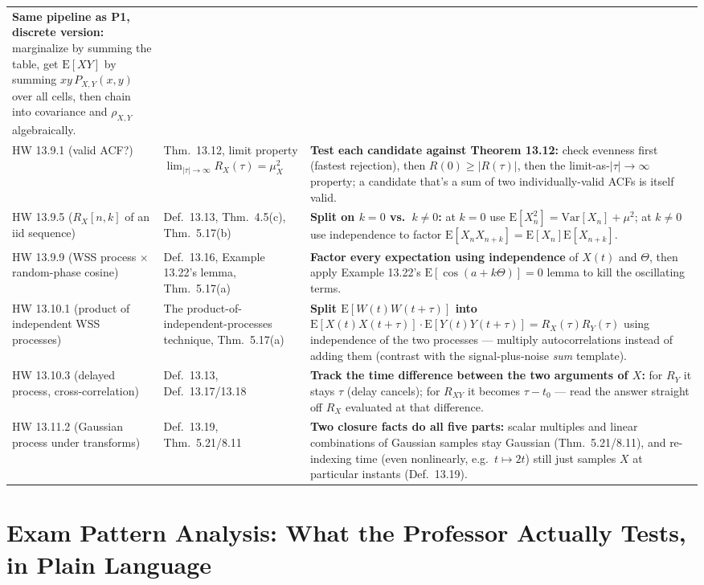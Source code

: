 \documentclass[10pt]{article}
\newcommand{\E}[1]{\mathrm{E}\left[#1\right]}
\newcommand{\Var}[1]{\mathrm{Var}\left[#1\right]}
\begin{document}
{\begin{longtable}{@{}p{2.5cm}p{4.7cm}p{6.4cm}@{}}
\textbf{Same pipeline as P1, discrete version:} marginalize by summing the table, get
$\E{XY}$ by summing $xy\,P_{X,Y}(x,y)$ over all cells, then chain into covariance and
$\rho_{X,Y}$ algebraically.\\[4pt]
HW 13.9.1 (valid ACF?) & Thm.\ 13.12, limit property $\lim_{|\tau|\to\infty}R_X(\tau)=\mu_X^2$
& \textbf{Test each candidate against Theorem 13.12:} check evenness first (fastest
rejection), then $R(0)\ge|R(\tau)|$, then the limit-as-$|\tau|\to\infty$ property; a
candidate that's a sum of two individually-valid ACFs is itself valid.\\[4pt]
HW 13.9.5 ($R_X[n,k]$ of an iid sequence) & Def.\ 13.13, Thm.\ 4.5(c), Thm.\ 5.17(b) &
\textbf{Split on $k=0$ vs.\ $k\ne0$:} at $k=0$ use $\E{X_n^2}=\Var{X_n}+\mu^2$; at $k\ne0$ use
independence to factor $\E{X_nX_{n+k}}=\E{X_n}\E{X_{n+k}}$.\\[4pt]
HW 13.9.9 (WSS process $\times$ random-phase cosine) & Def.\ 13.16, Example 13.22's lemma,
Thm.\ 5.17(a) & \textbf{Factor every expectation using independence} of $X(t)$ and $\Theta$,
then apply Example 13.22's $\E{\cos(a+k\Theta)}=0$ lemma to kill the oscillating terms.\\[4pt]
HW 13.10.1 (product of independent WSS processes) & The product-of-independent-processes
technique, Thm.\ 5.17(a) & \textbf{Split $\E{W(t)W(t+\tau)}$ into
$\E{X(t)X(t+\tau)}\cdot\E{Y(t)Y(t+\tau)}=R_X(\tau)R_Y(\tau)$} using independence of the two
processes --- multiply autocorrelations instead of adding them (contrast with the
signal-plus-noise \emph{sum} template).\\[4pt]
HW 13.10.3 (delayed process, cross-correlation) & Def.\ 13.13, Def.\ 13.17/13.18 &
\textbf{Track the time difference between the two arguments of $X$:} for $R_Y$ it stays
$\tau$ (delay cancels); for $R_{XY}$ it becomes $\tau-t_0$ --- read the answer straight off
$R_X$ evaluated at that difference.\\[4pt]
HW 13.11.2 (Gaussian process under transforms) & Def.\ 13.19, Thm.\ 5.21/8.11 & \textbf{Two
closure facts do all five parts:} scalar multiples and linear combinations of Gaussian
samples stay Gaussian (Thm.\ 5.21/8.11), and re-indexing time (even nonlinearly, e.g.\
$t\mapsto2t$) still just samples $X$ at particular instants (Def.\ 13.19).\\
\bottomrule
\end{longtable}
}

\section*{Exam Pattern Analysis: What the Professor Actually Tests, in Plain Language}
\addcontentsline{toc}{section}{Exam Pattern Analysis}
\end{document}

